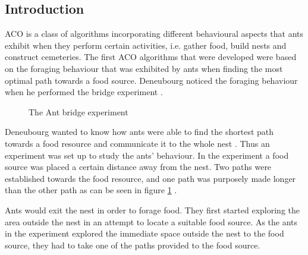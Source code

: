 \subsection{Introduction}
\label{sec:ACOverview}
ACO is a class of algorithms incorporating different behavioural aspects that ants exhibit when they perform certain activities, i.e. gather food, build nests and construct cemeteries\cite{AntsAndStigmergy,CompuIntelligenceIntro}. The first ACO algorithms that were developed were based on the foraging behaviour that was exhibited by ants when finding the most optimal path towards a food source. Deneubourg noticed the foraging behaviour when he performed the bridge experiment \cite{AntsAndStigmergy,CompuIntelligenceIntro}.
\begin{figure}[b!]
	\centering
	\setlength \fboxsep{0pt}
	\setlength \fboxrule{0.5pt}
	\caption{The Ant bridge experiment \cite{AntsAndStigmergy}}
	\label{fig:antBridgeExperiment}
\end{figure}

Deneubourg wanted to know how ants were able to find the shortest path towards a food resource and communicate it to the whole nest \cite{AntsAndStigmergy}. Thus an experiment was set up to study the ants' behaviour. In the experiment a food source was placed a certain distance away from the nest\cite{AntsAndStigmergy,CompuIntelligenceIntro}. Two paths were established towards the food resource, and one path was purposely made longer than the other path as can be seen in figure \ref{fig:antBridgeExperiment} \cite{AntsAndStigmergy}.

Ants would exit the nest in order to forage food\cite{AntsAndStigmergy,CompuIntelligenceIntro}. They first started exploring the area outside the nest in an attempt to locate a suitable food source\cite{AntsAndStigmergy,CompuIntelligenceIntro}. As the ants in the experiment explored the immediate space outside the nest to the food source, they had to take one of the paths provided to the food source\cite{AntsAndStigmergy}.

